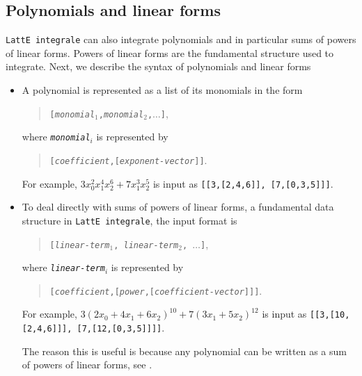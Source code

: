 \documentclass{article}
\newcommand{\latteInt}{{\tt LattE integrale}\xspace}
\begin{document}
\subsection{Polynomials and linear forms}
\label{input-file:polynomial-and-linear-form}

\latteInt can also integrate polynomials and in particular sums of powers of linear forms. Powers of linear forms are the fundamental structure used to integrate. Next, we describe the syntax of polynomials and linear forms

\begin{itemize}
\item A polynomial is represented as a list of its monomials in the form
  \begin{quote}
    \texttt{[{\itshape monomial}$_1$,{\itshape monomial}$_2$,$\dots$]},
  \end{quote}
  where \texttt{{\itshape monomial}$_i$} is represented by
  \begin{quote}
    \texttt{[{\itshape coefficient},[{\itshape exponent-vector}]]}.
  \end{quote}
  For example, $3x_0^2x_1^4x_2^6 + 7x_1^3x_2^5$ is input as \texttt{[[3,[2,4,6]], [7,[0,3,5]]]}. 

\item To deal directly with sums of powers of linear forms, a fundamental data structure in \latteInt, the input format is 
  \begin{quote}
    \texttt{[{\itshape linear-term$_1$}, {\itshape linear-term$_2$}, $\dots$]},
    \end{quote}
    where \texttt{{\itshape linear-term}$_i$} is represented by
    \begin{quote}
      \texttt{[{\itshape coefficient},[{\itshape power},[{\itshape coefficient-vector}]]]}.
    \end{quote}
    For example, $3(2x_0 + 4x_1 + 6x_2)^{10} + 7(3x_1 + 5x_2)^{12}$ is input
    as \texttt{[[3,[10,[2,4,6]]], [7,[12,[0,3,5]]]]}. 


The reason this is useful is because any polynomial can be written as a sum of powers of linear forms, see \cite{howToIntegratePolynomialSimplex}.


\end{itemize}

\end{document}
